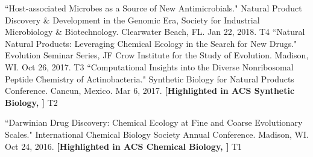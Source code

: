 \begin{cvpubs}
  \cvpub
    {``Host-associated Microbes as a Source of New Antimicrobials." Natural Product Discovery \& Development in the Genomic Era, Society for Industrial Microbiology \& Biotechnology. Clearwater Beach, FL. Jan 22, 2018.} %
    {T4} %
  \cvpub
    {``Natural Natural Products: Leveraging Chemical Ecology in the Search for New Drugs." Evolution Seminar Series, JF Crow Institute for the Study of Evolution. Madison, WI. Oct 26, 2017.} %
    {T3} %
  \cvpub
    {``Computational Insights into the Diverse Nonribosomal Peptide Chemistry of Actinobacteria." Synthetic Biology for Natural Products Conference. Cancun, Mexico. Mar 6, 2017.
	\linebreak \textbf{[Highlighted in ACS Synthetic Biology, \textit{}]}    
    } %
    {T2} %
\end{cvpubs}
\begin{cvpubs}
  \cvpub
    {``Darwinian Drug Discovery: Chemical Ecology at Fine and Coarse Evolutionary Scales." International Chemical Biology Society Annual Conference. Madison, WI. Oct 24, 2016.
	\linebreak \textbf{[Highlighted in ACS Chemical Biology, \textit{}]}     
    } %
    {T1} %
\end{cvpubs}



